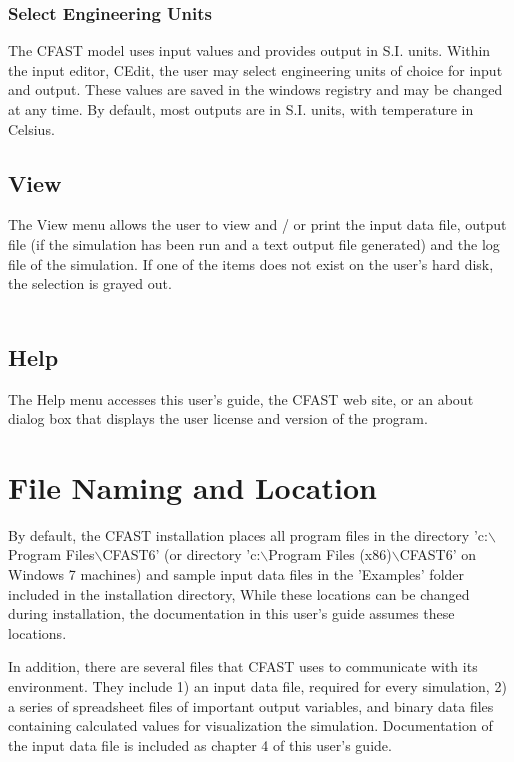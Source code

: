 \subsubsection{Select Engineering Units} 

The CFAST model uses input values and provides output in S.I. units. Within the input editor, CEdit, the user may select engineering units of choice for input and output.  These values are saved in the windows registry and may be changed at any time. By default, most outputs are in S.I. units, with temperature in Celsius.


\subsection{View}

The View menu allows the user to view and / or print the input data file, output file (if the simulation has been run and a text output file generated) and the log file of the simulation. If one of the items does not exist on the user's hard disk, the selection is grayed out. \\~ \\

\subsection{Help}

The Help menu accesses this user's guide, the CFAST web site, or an about dialog box that displays the user license and version of the program.



\section{File Naming and Location}

By default, the CFAST installation places all program files in the directory 'c:$\backslash$Program Files$\backslash$CFAST6' (or directory 'c:$\backslash$Program Files (x86)$\backslash$CFAST6'  on Windows 7 machines) and sample input data files in the 'Examples' folder included in the installation directory, While these locations can be changed during installation, the documentation in this user's guide assumes these locations.

In addition, there are several files that CFAST uses to communicate with its environment.  They include 1) an input data file, required for every simulation, 2) a series of spreadsheet files of important output variables, and binary data files containing calculated values for visualization the simulation.  Documentation of the input data file is included as chapter 4 of this user's guide.

